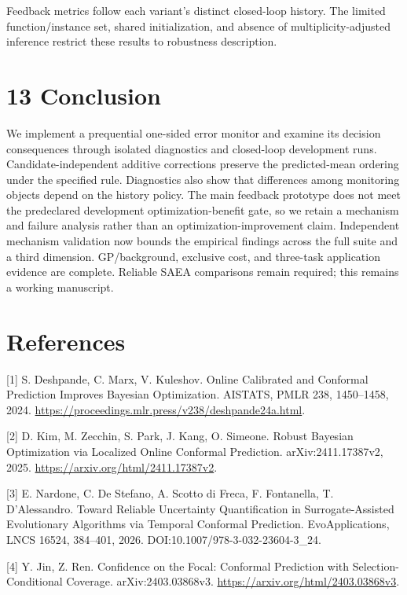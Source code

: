 \documentclass[11pt,a4paper]{article}
\begin{document}
Feedback metrics follow each variant's distinct closed-loop history. The
limited function/instance set, shared initialization, and absence of
multiplicity-adjusted inference restrict these results to robustness
description.

\hypertarget{conclusion}{%
\section{13 Conclusion}\label{conclusion}}

We implement a prequential one-sided error monitor and examine its
decision consequences through isolated diagnostics and closed-loop
development runs. Candidate-independent additive corrections preserve
the predicted-mean ordering under the specified rule. Diagnostics also
show that differences among monitoring objects depend on the history
policy. The main feedback prototype does not meet the predeclared
development optimization-benefit gate, so we retain a mechanism and
failure analysis rather than an optimization-improvement claim.
Independent mechanism validation now bounds the empirical findings
across the full suite and a third dimension. GP/background, exclusive
cost, and three-task application evidence are complete. Reliable SAEA
comparisons remain required; this remains a working manuscript.

\hypertarget{references}{%
\section{References}\label{references}}

{[}1{]} S. Deshpande, C. Marx, V. Kuleshov. Online Calibrated and
Conformal Prediction Improves Bayesian Optimization. AISTATS, PMLR 238,
1450--1458, 2024.
\url{https://proceedings.mlr.press/v238/deshpande24a.html}.

{[}2{]} D. Kim, M. Zecchin, S. Park, J. Kang, O. Simeone. Robust
Bayesian Optimization via Localized Online Conformal Prediction.
arXiv:2411.17387v2, 2025. \url{https://arxiv.org/html/2411.17387v2}.

{[}3{]} E. Nardone, C. De Stefano, A. Scotto di Freca, F. Fontanella, T.
D'Alessandro. Toward Reliable Uncertainty Quantification in
Surrogate-Assisted Evolutionary Algorithms via Temporal Conformal
Prediction. EvoApplications, LNCS 16524, 384--401, 2026.
DOI:10.1007/978-3-032-23604-3\_24.

{[}4{]} Y. Jin, Z. Ren. Confidence on the Focal: Conformal Prediction
with Selection-Conditional Coverage. arXiv:2403.03868v3.
\url{https://arxiv.org/html/2403.03868v3}.
\end{document}
